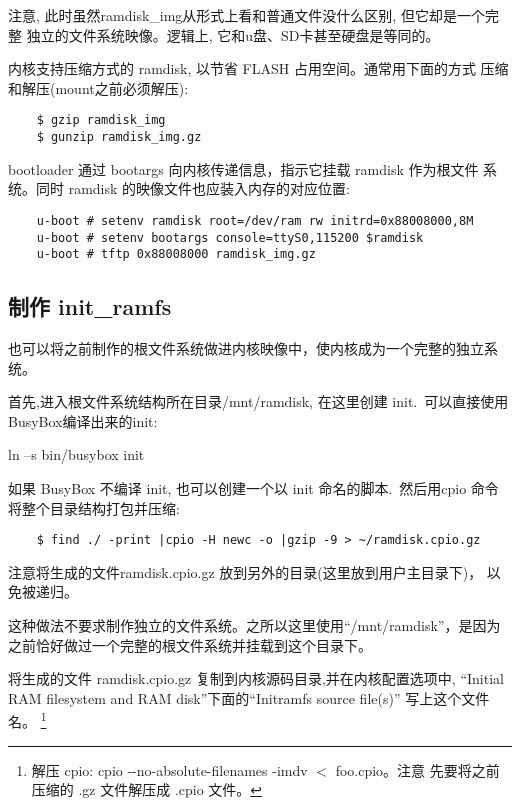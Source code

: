 	注意, 此时虽然ramdisk\_img从形式上看和普通文件没什么区别, 但它却是一个完整
独立的文件系统映像。逻辑上, 它和u盘、SD卡甚至硬盘是等同的。

	内核支持压缩方式的 ramdisk, 以节省 FLASH 占用空间。通常用下面的方式
压缩和解压(mount之前必须解压):

\begin{boxedminipage}{.9\textwidth}
\begin{verbatim}
	$ gzip ramdisk_img
	$ gunzip ramdisk_img.gz
\end{verbatim}
\end{boxedminipage}

	bootloader 通过 bootargs 向内核传递信息，指示它挂载 ramdisk 作为根文件
系统。同时 ramdisk 的映像文件也应装入内存的对应位置:

\begin{boxedminipage}{.9\textwidth}
\begin{verbatim}
	u-boot # setenv ramdisk root=/dev/ram rw initrd=0x88008000,8M
	u-boot # setenv bootargs console=ttyS0,115200 $ramdisk
	u-boot # tftp 0x88008000 ramdisk_img.gz
\end{verbatim}
\end{boxedminipage}

\subsection{制作 init\_ramfs}
	也可以将之前制作的根文件系统做进内核映像中，使内核成为一个完整的独立系统。

    首先,进入根文件系统结构所在目录/mnt/ramdisk, 在这里创建 init.~可以直接使用
BusyBox编译出来的init:

    ln --s bin/busybox init

    如果 BusyBox 不编译 init, 也可以创建一个以 init 命名的脚本.~然后用cpio 命令
将整个目录结构打包并压缩:

\begin{boxedminipage}{.9\textwidth}
\begin{verbatim}
	$ find ./ -print |cpio -H newc -o |gzip -9 > ~/ramdisk.cpio.gz
\end{verbatim}
\end{boxedminipage}

    注意将生成的文件ramdisk.cpio.gz 放到另外的目录(这里放到用户主目录下)，
    以免被递归。

	这种做法不要求制作独立的文件系统。之所以这里使用``/mnt/ramdisk''，是因为
之前恰好做过一个完整的根文件系统并挂载到这个目录下。

	将生成的文件 ramdisk.cpio.gz 复制到内核源码目录,并在内核配置选项中,
``Initial RAM filesystem and RAM disk''下面的``Initramfs source file(s)''
写上这个文件名。
\footnote{解压 cpio: cpio -{}-no-absolute-filenames -imdv $<$ foo.cpio。注意
    先要将之前压缩的 .gz 文件解压成 .cpio 文件。}

